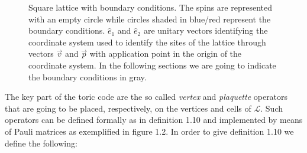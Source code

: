 \documentclass{Configuration_Files/PoliMi3i_thesis}
\begin{document}
\begin{figure}
\begin{center}
	\end{center}
	
	\caption{Square lattice with boundary conditions. The spins are represented with an empty circle while circles shaded in blue/red represent the boundary conditions. $\hat{e}_1$ and $\hat{e}_2$ are unitary vectors identifying the coordinate system used to identify the sites of the lattice through vectors $\vec{v}$ and $\vec{p}$ with application point in the origin of the coordinate system.
	In the following sections we are going to indicate the boundary conditions in gray.}
	\label{fig:lattice}
\end{figure}

\newpage
The key part of the toric code are the so called \textit{vertex} and \textit{plaquette} operators that are going to be placed, respectively, on the vertices and cells of $\mathcal{L}$. Such operators can be defined formally as in definition 1.10 and implemented by means of Pauli matrices as exemplified in figure 1.2. In order to give definition 1.10 we define the following:
\end{document}
